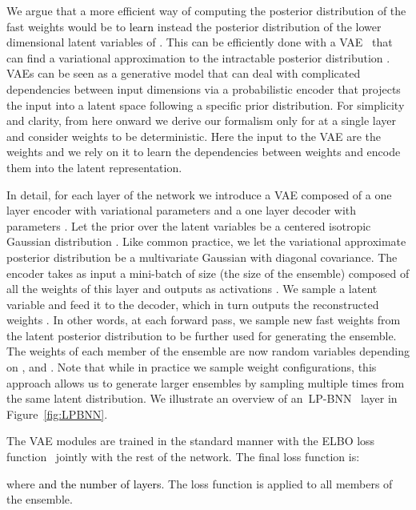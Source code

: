 \documentclass[10pt,twocolumn,letterpaper]{article}
\newcommand\Gianni{\textcolor{black}}
\newcommand{\ab}[1]{\textcolor{black}{#1}}
\newcommand{\method}{LP-BNN\xspace}
\begin{document}
We argue that a more efficient way of computing the posterior distribution of the fast weights would be to 
\ab{learn} instead the posterior distribution of the lower dimensional latent variables of . This can be efficiently done with a VAE~\cite{kingma13vae} that can find a variational approximation  to the intractable posterior distribution .  VAEs can be seen as a generative model that can deal with complicated dependencies between input dimensions via a probabilistic encoder that projects the input into a latent space following a specific prior distribution. For simplicity and clarity, from here onward we derive our formalism only for  at a single layer and consider weights  to be deterministic. Here the input to the VAE are the weights  and we rely on it  to learn the dependencies between weights and encode them into the latent representation.



In detail, for each layer of the network  we introduce a VAE composed of a one layer encoder 
 with variational parameters  and a one layer decoder 
 with parameters . Let the prior over the latent variables be a centered isotropic Gaussian distribution . Like common practice, we let the variational approximate posterior distribution  be a multivariate Gaussian with diagonal covariance. The encoder takes as input a mini-batch of size  (the size of the ensemble) composed of all the  weights of this layer and outputs as activations . We sample a latent variable  and feed it to the decoder, which in turn outputs the reconstructed weights 
. In other words, at each forward pass, we sample new fast weights  from the latent posterior distribution to be further used for generating the ensemble. The weights of each member of the ensemble  are now random variables depending on ,  and .
Note that while in practice we sample  weight configurations, this approach allows us to generate larger ensembles by sampling multiple times from the same latent {distribution}. 
We illustrate an overview of an~\method~ layer in Figure~\ref{fig:LPBNN}.


The VAE modules are trained in the standard manner with the ELBO loss function~\cite{kingma13vae} jointly with the rest of the network. The final loss function is:

where  \Gianni{and  the number of layers}. The loss function is applied to all  members of the ensemble. 
\end{document}
